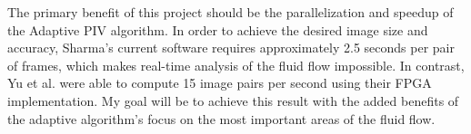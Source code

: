 \documentclass{article}
\begin{document}
	The primary benefit of this project should be the parallelization and speedup of the Adaptive PIV algorithm. In order to achieve the desired image size and accuracy, Sharma's current software requires approximately 2.5 seconds per pair of frames, which makes real-time analysis of the fluid flow impossible. In contrast, Yu et al. were able to compute 15 image pairs per second using their FPGA implementation. My goal will be to achieve this result with the added benefits of the adaptive algorithm's focus on the most important areas of the fluid flow.



	
	
\end{document}

